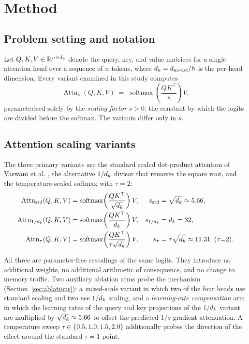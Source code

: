 \section{Method}\label{sec:method}

\subsection{Problem setting and notation}\label{sec:notation}
Let $Q, K, V \in \mathbb{R}^{n \times d_k}$ denote the query, key, and value
matrices for a single attention head over a sequence of $n$ tokens, where
$d_k = d_{\text{model}}/h$ is the per-head dimension. Every variant examined in
this study computes
\begin{equation}\label{eq:generic}
  \operatorname{Attn}_s(Q, K, V) \;=\; \operatorname{softmax}\!\left(
  \frac{QK^{\top}}{s}\right)V,
\end{equation}
parameterised solely by the \emph{scaling factor} $s > 0$: the constant by which
the logits are divided before the softmax. The variants differ only in $s$.

\subsection{Attention scaling variants}\label{sec:variants}
The three primary variants are the standard scaled dot-product attention of
Vaswani et al. \cite{vaswani2017}, the alternative $1/d_k$ divisor that removes
the square root, and the temperature-scaled softmax with $\tau = 2$:
\begin{align}
  \operatorname{Attn}_{\mathrm{std}}(Q,K,V)
      &= \operatorname{softmax}\!\left(\frac{QK^{\top}}{\sqrt{d_k}}\right)V,
      & s_{\mathrm{std}} &= \sqrt{d_k} \approx 5.66, \label{eq:standard}\\
  \operatorname{Attn}_{1/d_k}(Q,K,V)
      &= \operatorname{softmax}\!\left(\frac{QK^{\top}}{d_k}\right)V,
      & s_{1/d_k} &= d_k = 32, \label{eq:dk}\\
  \operatorname{Attn}_{\tau}(Q,K,V)
      &= \operatorname{softmax}\!\left(\frac{QK^{\top}}{\tau\sqrt{d_k}}\right)V,
      & s_{\tau} &= \tau\sqrt{d_k} \approx 11.31 \;\;(\tau{=}2). \label{eq:temp}
\end{align}

All three are parameter-free rescalings of the same logits. They introduce no
additional weights, no additional arithmetic of consequence, and no change to
memory traffic. Two auxiliary ablation arms probe the mechanism
(Section~\ref{sec:ablations}): a \emph{mixed-scale} variant in which two of the
four heads use standard scaling and two use $1/d_k$ scaling, and a
\emph{learning-rate compensation} arm in which the learning rates of the query
and key projections of the $1/d_k$ variant are multiplied by
$\sqrt{d_k} \approx 5.66$ to offset the predicted $1/s$ gradient attenuation.
A temperature sweep $\tau \in \{0.5, 1.0, 1.5, 2.0\}$ additionally probes the
direction of the effect around the standard $\tau = 1$ point.

